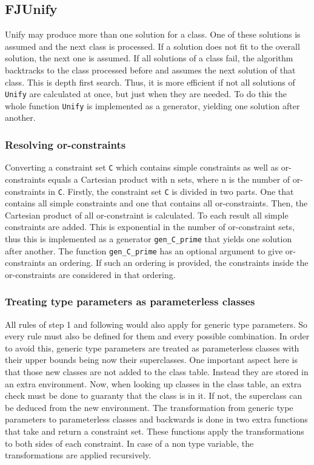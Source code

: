 \subsection{FJUnify}

Unify may produce more than one solution for a class. One of these solutions is assumed and the next class is processed. If a solution does not fit to the overall solution, the next one is assumed.
If all solutions of a class fail, the algorithm backtracks to the class processed before and assumes the next solution of that class. This is depth first search. Thus, it is more efficient if not all solutions of \verb|Unify| are calculated at once, but just when they are needed.
To do this the whole function \verb|Unify| is implemented as a generator, yielding one solution after another.

\subsubsection{Resolving or-constraints}
Converting a constraint set \verb|C| which contains simple constraints as well as or-constraints equals a Cartesian product with n sets, where n is the number of or-constraints in \verb|C|.
Firstly, the constraint set \verb|C| is divided in two parts. One that contains all simple constraints and one that contains all or-constraints.
Then, the Cartesian product of all or-constraint is calculated. To each result all simple constraints are added. This is exponential in the number of or-constraint sets, thus this is implemented as a generator \verb|gen_C_prime| that yields one solution after another.
The function \verb|gen_C_prime| has an optional argument to give or-constraints an ordering. If such an ordering is provided, the constraints inside the or-constraints are considered in that ordering.

\subsubsection{Treating type parameters as parameterless classes}
All rules of step 1 and following would also apply for generic type parameters. So every rule must also be defined for them and every possible combination. In order to avoid this, generic type parameters are treated as parameterless classes with their upper bounds being now their superclasses. One important aspect here is that those new classes are not added to the class table. Instead they are stored in an extra environment. Now, when looking up classes in the class table, an extra check must be done to guaranty that the class is in it. If not, the superclass can be deduced from the new environment.
The transformation from  generic type parameters to parameterless classes and backwards is done in two extra functions that take and return a constraint set.
These functions apply the transformations to both sides of each constraint. In case of a non type variable, the transformations are applied recursively.


